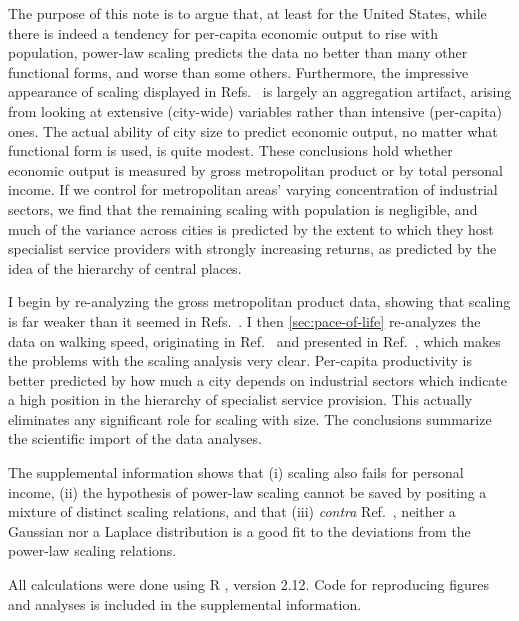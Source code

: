 \documentclass{pnastwo}
\begin{document}
\begin{article}
The purpose of this note is to argue that, at least for the United States,
while there is indeed a tendency for per-capita economic output to rise with
population, power-law scaling predicts the data no better than many other
functional forms, and worse than some others.  Furthermore, the impressive
appearance of scaling displayed in Refs.\
\cite{Bettencout-et-al-growth-innovation-scaling,Bettencourt-et-al-urban-scaling-and-its-deviations}
is largely an aggregation artifact, arising from looking at extensive
(city-wide) variables rather than intensive (per-capita) ones.  The actual
ability of city size to predict economic output, no matter what functional form
is used, is quite modest.  These conclusions hold whether economic output is
measured by gross metropolitan product or by total personal income.  If we
control for metropolitan areas' varying concentration of industrial sectors, we
find that the remaining scaling with population is negligible, and much of the
variance across cities is predicted by the extent to which they host specialist
service providers with strongly increasing returns, as predicted by the idea of
the hierarchy of central places.

I begin by re-analyzing the gross metropolitan product data, showing that
scaling is far weaker than it seemed in Refs.\
\cite{Bettencout-et-al-growth-innovation-scaling,Bettencourt-et-al-urban-scaling-and-its-deviations}. I
then \ref{sec:pace-of-life} re-analyzes the data on walking speed, originating
in Ref.\ \cite{Bornstein-Bornstein-pace-of-life} and presented in Ref.\
\cite{Bettencout-et-al-growth-innovation-scaling}, which makes the problems
with the scaling analysis very clear.  Per-capita productivity is better
predicted by how much a city depends on industrial sectors which indicate a
high position in the hierarchy of specialist service provision.  This actually
eliminates any significant role for scaling with size.  The conclusions
summarize the scientific import of the data analyses.

The supplemental information shows that (i) scaling also fails for personal
income, (ii) the hypothesis of power-law scaling cannot be saved by positing a
mixture of distinct scaling relations, and that (iii) {\em contra} Ref.\
\cite{Bettencourt-et-al-urban-scaling-and-its-deviations}, neither a Gaussian
nor a Laplace distribution is a good fit to the deviations from the power-law
scaling relations.

All calculations were done using R \cite{R}, version 2.12.  Code for reproducing
figures and analyses is included in the supplemental information.


\end{article}
\end{document}
